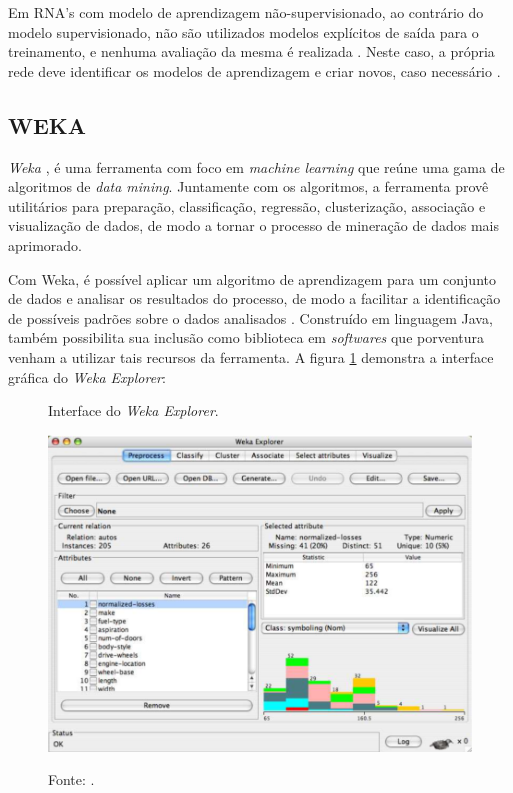 Em RNA's com modelo de aprendizagem não-supervisionado, ao contrário do modelo supervisionado, não são utilizados modelos explícitos de saída para o treinamento, e nenhuma avaliação da mesma é realizada \cite{von2005rede}. Neste caso, a própria rede deve identificar os modelos de aprendizagem e criar novos, caso necessário \cite{becker1991}.

\subsection{WEKA}

\textit{Weka} \cite{hall2009weka}, é uma ferramenta com foco em \textit{machine learning} que reúne uma gama de algoritmos de \textit{data mining}. Juntamente com os algoritmos, a ferramenta provê utilitários para preparação, classificação, regressão, clusterização, associação e visualização de dados, de modo a tornar o processo de mineração de dados mais aprimorado.

Com Weka, é possível aplicar um algoritmo de aprendizagem para um conjunto de dados e analisar os resultados do processo, de modo a facilitar a identificação de possíveis padrões sobre o dados analisados \cite{eibe2016weka}. Construído em linguagem Java, também possibilita sua inclusão como biblioteca em \textit{softwares} que porventura venham a utilizar tais recursos da ferramenta. A figura \ref{figura:weka_explorer} demonstra a interface gráfica do \textit{Weka Explorer}:

\begin{figure}[H]
	\caption{Interface do \textit{Weka Explorer}.}
	\centering %
	\includegraphics[width=13cm]{resources/weka.png} %
	\label{figura:weka_explorer}
	\captionsetup{singlelinecheck = false, format= hang, justification=raggedright, labelsep=space, width=13cm}
	\caption*{\footnotesize Fonte: .}
\end{figure}

